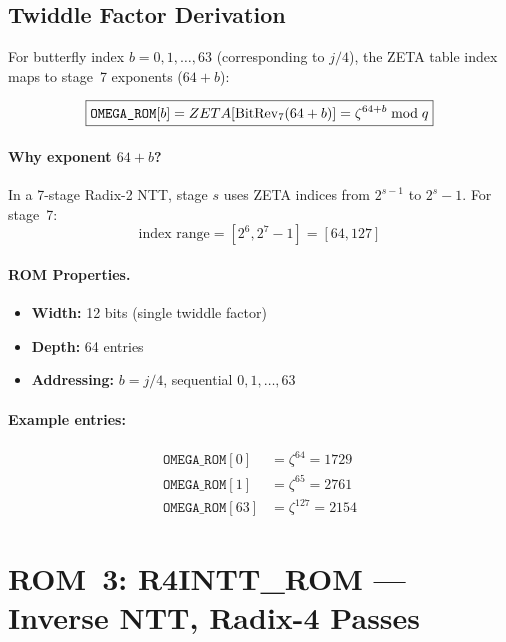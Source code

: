\documentclass[11pt,a4paper]{article}
\newcommand{\brev}[1]{\operatorname{BitRev}_{7}\!\left(#1\right)}
\newcommand{\rom}[1]{\textsc{#1}}
\begin{document}
\subsection{Twiddle Factor Derivation}

For butterfly index $b = 0, 1, \ldots, 63$ (corresponding to $j/4$), the ZETA table index maps to stage~7 exponents ($64 + b$):

\begin{equation}
  \boxed{%
    \texttt{OMEGA\_ROM}[b] = ZETA\!\left[\brev{64 + b}\right] = \zeta^{64+b} \bmod q
  }
  \label{eq:omega-rom}
\end{equation}

\paragraph{Why exponent $64 + b$?}

In a 7-stage Radix-2 NTT, stage $s$ uses ZETA indices from $2^{s-1}$ to $2^s - 1$. For stage~7:
\[
  \text{index range} = [2^6, 2^7 - 1] = [64, 127]
\]

\paragraph{ROM Properties.}
\begin{itemize}
  \item \textbf{Width:} 12 bits (single twiddle factor)
  \item \textbf{Depth:} 64 entries
  \item \textbf{Addressing:} $b = j/4$, sequential $0, 1, \ldots, 63$
\end{itemize}

\paragraph{Example entries:}
\begin{align*}
  \texttt{OMEGA\_ROM}[0] &= \zeta^{64} = 1729 \\
  \texttt{OMEGA\_ROM}[1] &= \zeta^{65} = 2761 \\
  \texttt{OMEGA\_ROM}[63] &= \zeta^{127} = 2154
\end{align*}

\section{ROM~3: \rom{R4INTT\_ROM} --- Inverse NTT, Radix-4 Passes}
\label{sec:r4intt-rom}
\end{document}
